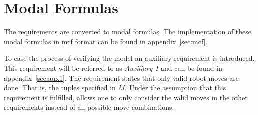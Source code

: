\section{Modal Formulas}\label{sec:modal_formulas}
The requirements are converted to modal formulas. The implementation of these modal formulas in mcf format can be found in appendix~\ref{sec:mcf}.

To ease the process of verifying the model an auxiliary requirement is introduced.
This requirement will be referred to as \textit{Auxiliary 1} and can be found in appendix~\ref{sec:aux1}.
The requirement states that only valid robot moves are done.
That is, the tuples specified in $M$.
Under the assumption that this requirement is fulfilled, allows one to only consider the valid moves in the other requirements instead of all possible move combinations.
